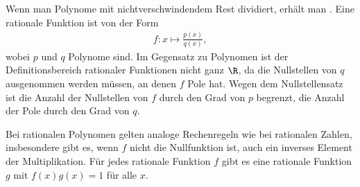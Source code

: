 \documentclass[letterpaper,10pt,english]{jupyterBook}
\begin{document}
Wenn man Polynome mit nichtverschwindendem Rest dividiert, erhält man .
Eine rationale Funktion ist von der Form
\begin{equation*}
\begin{split} f:x\mapsto  \frac{p(x)}{q(x)}, \end{split}
\end{equation*}
wobei \(p\) und \(q\) Polynome sind. Im Gegensatz zu Polynomen ist der Definitionsbereich rationaler Funktionen nicht ganz \(\R\), da die Nullstellen von \(q\) ausgenommen werden müssen, an denen \(f\) Pole hat. Wegen dem Nullstellensatz ist die Anzahl der Nullstellen von \(f\) durch den Grad von \(p\) begrenzt, die Anzahl der Pole durch den Grad von \(q\).

Bei rationalen Polynomen gelten analoge Rechenregeln wie bei rationalen Zahlen, insbesondere gibt es, wenn \(f\) nicht die Nullfunktion ist, auch ein inverses Element der Multiplikation. Für jedes rationale Funktion \(f\) gibt es eine rationale Funktion \(g\) mit \(f(x) g(x) = 1\) für alle \(x\).
\end{document}
